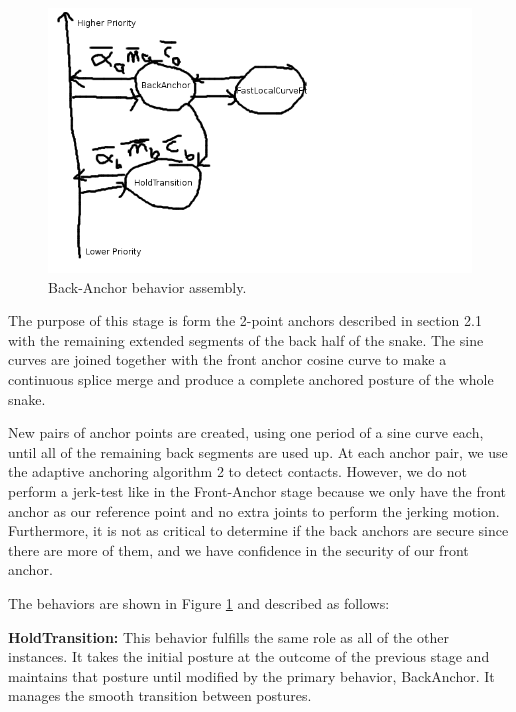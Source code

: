 \begin{figure}
\begin{center}
\includegraphics[scale=0.5]{2_adaptive_4.png}
\end{center}
\caption{Back-Anchor behavior assembly.}
\label{adaptive4}
\end{figure}


The purpose of this stage is form the 2-point anchors described in section 2.1 with the remaining extended segments of the back half of the snake.  The sine curves are joined together with the front anchor cosine curve to make a continuous splice merge and produce a complete anchored posture of the whole snake.

New pairs of anchor points are created, using one period of a sine curve each, until all of the remaining back segments are used up.  At each anchor pair, we use the adaptive anchoring algorithm 2 to detect contacts.  However, we do not perform a jerk-test like in the Front-Anchor stage because we only have the front anchor as our reference point and no extra joints to perform the jerking motion.  Furthermore, it is not as critical to determine if the back anchors are secure since there are more of them, and we have confidence in the security of our front anchor.


The behaviors are shown in Figure \ref{adaptive4} and described as follows:

\textbf{HoldTransition:} 
This behavior fulfills the same role as all of the other instances.  It takes the initial posture at the outcome of the previous stage and maintains that posture until modified by the primary behavior, BackAnchor.   It manages the smooth transition between postures.

